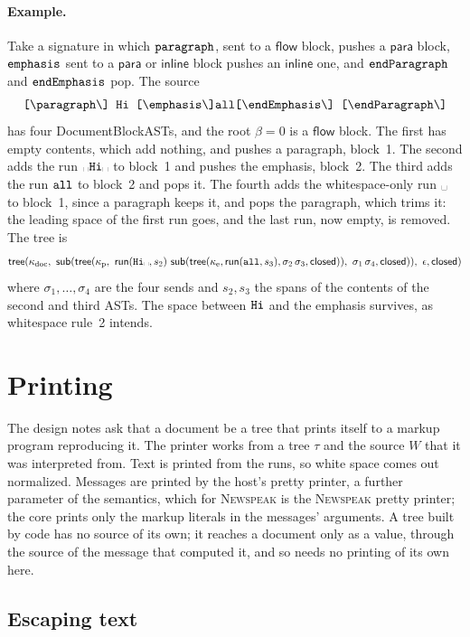 \documentclass[11pt]{article}
\numberwithin{equation}{section}
\newcommand{\NS}{\textsc{Newspeak}}
\newcommand{\kw}[1]{\ensuremath{\mathsf{#1}}}
\newcommand{\str}[1]{\ensuremath{\text{\texttt{#1}}}}
\newcommand{\bs}{\textbackslash}
\newcommand{\vs}{\text{\textvisiblespace}}
\begin{document}
\paragraph{Example.}
Take a signature in which $\str{paragraph}$, sent to a $\kw{flow}$ block,
pushes a $\kw{para}$ block, $\str{emphasis}$ sent to a $\kw{para}$ or
$\kw{inline}$ block pushes an $\kw{inline}$ one, and $\str{endParagraph}$
and $\str{endEmphasis}$ pop.  The source
\[
\str{[\bs{}paragraph\bs]\ Hi\ [\bs{}emphasis\bs]all[\bs{}endEmphasis\bs]\ [\bs{}endParagraph\bs]}
\]
has four DocumentBlockASTs, and the root $\beta = 0$ is a $\kw{flow}$
block.  The first has empty contents, which add nothing, and pushes a
paragraph, block~1.  The second adds the run $\vs\str{Hi}
\vs$ to block~1 and pushes the emphasis, block~2.  The third
adds the run $\str{all}$ to block~2 and pops it.  The fourth adds the
whitespace-only run $\vs$ to block~1, since a paragraph keeps
it, and pops the paragraph, which trims it: the leading space of the first
run goes, and the last run, now empty, is removed.  The tree is
\[
\kw{tree}(\kappa_{\mathrm{doc}},\ 
  \kw{sub}(\kw{tree}(\kappa_{\mathrm{p}},\
    \kw{run}(\str{Hi}\vs, s_2)\
    \kw{sub}(\kw{tree}(\kappa_{\mathrm{e}}, \kw{run}(\str{all}, s_3),
      \sigma_2\,\sigma_3, \kw{closed})),\
    \sigma_1\,\sigma_4, \kw{closed})),\
  \epsilon, \kw{closed})
\]
where $\sigma_1, \ldots, \sigma_4$ are the four sends and $s_2, s_3$ the
spans of the contents of the second and third ASTs.  The space between
\str{Hi} and the emphasis survives, as whitespace rule~2 intends.

\section{Printing}
\label{sec:printing}

The design notes ask that a document be a tree that prints itself to a
markup program reproducing it.  The printer works from a tree $\tau$ and the
source $W$ that it was interpreted from.  Text is printed from the runs, so
white space comes out normalized.  Messages are printed by the host's
pretty printer, a further parameter of the semantics, which for \NS{} is
the \NS{} pretty printer; the core prints only the markup literals in the
messages' arguments.  A
tree built by code has no source of its own; it reaches a document only as
a value, through the source of the message that computed it, and so needs
no printing of its own here.

\subsection{Escaping text}
\end{document}
